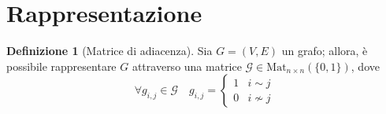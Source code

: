 \documentclass[14pt]{extreport}
\theoremstyle{definition}
\newtheorem{definition}{Definizione}[section]
\theoremstyle{definition}
\begin{document}
\section{Rappresentazione}

\begin{definition}[Matrice di adiacenza]
    Sia $G = (V, E)$ un grafo; allora, è possibile rappresentare $G$ attraverso una matrice $\mathcal{G} \in \textrm{Mat}_{n \times n}(\{0, 1\})$, dove $$\forall g_{i, j} \in \mathcal{G} \quad g_{i, j} = \left \{ \begin{array}{ll} 1 & i \sim j\\ 0 & i \nsim j \end{array} \right.$$
\end{definition}
\end{document}
